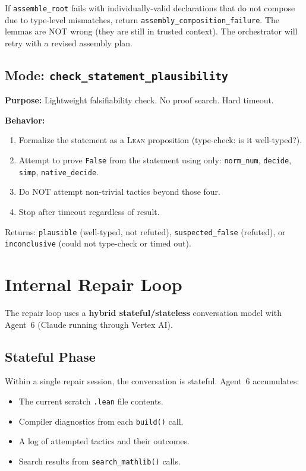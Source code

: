 \documentclass[11pt,a4paper]{article}
\newcommand{\Lean}{\textsc{Lean}}
\newcommand{\Vertex}{Vertex AI}
\newcommand{\Claude}{Claude}
\begin{document}
\begin{goodbox}
If \texttt{assemble\_root} fails with individually-valid declarations that do not compose due to type-level mismatches, return \texttt{assembly\_composition\_failure}. The lemmas are NOT wrong (they are still in trusted context). The orchestrator will retry with a revised assembly plan.
\end{goodbox}

\subsection{Mode: \texttt{check\_statement\_plausibility}}

\textbf{Purpose:} Lightweight falsifiability check. No proof search. Hard timeout.

\textbf{Behavior:}
\begin{enumerate}[leftmargin=2em]
  \item Formalize the statement as a \Lean{} proposition (type-check: is it well-typed?).
  \item Attempt to prove \texttt{False} from the statement using only: \texttt{norm\_num}, \texttt{decide}, \texttt{simp}, \texttt{native\_decide}.
  \item Do NOT attempt non-trivial tactics beyond those four.
  \item Stop after timeout regardless of result.
\end{enumerate}

Returns: \texttt{plausible} (well-typed, not refuted), \texttt{suspected\_false} (refuted), or \texttt{inconclusive} (could not type-check or timed out).

\section{Internal Repair Loop}
\label{sec:repair_loop}

The repair loop uses a \textbf{hybrid stateful/stateless} conversation model with Agent~6 (\Claude{} running through \Vertex{}).

\subsection{Stateful Phase}
Within a single repair session, the conversation is stateful. Agent~6 accumulates:
\begin{itemize}[leftmargin=2em]
  \item The current scratch \texttt{.lean} file contents.
  \item Compiler diagnostics from each \texttt{build()} call.
  \item A log of attempted tactics and their outcomes.
  \item Search results from \texttt{search\_mathlib()} calls.
\end{itemize}
\end{document}
